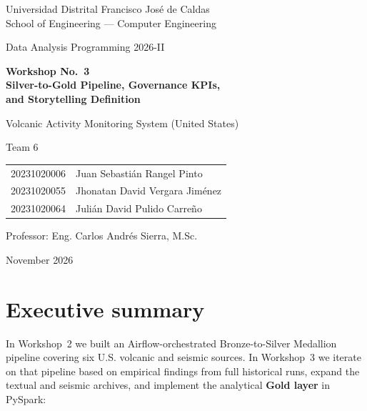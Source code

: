 \documentclass[11pt,a4paper]{article}
\begin{document}
\begin{titlepage}
\centering
{\large Universidad Distrital Francisco José de Caldas\\ School of Engineering --- Computer Engineering\par}
\vspace{1.2cm}
{\Large Data Analysis Programming 2026-II\par}
\vspace{1.5cm}
{\huge\bfseries Workshop No.~3\\[4pt] Silver-to-Gold Pipeline, Governance KPIs,\\ and Storytelling Definition\par}
\vspace{0.8cm}
{\Large Volcanic Activity Monitoring System (United States)\par}
\vspace{1.5cm}
{\large Team 6\par}
\vspace{0.4cm}
\begin{tabular}{ll}
20231020006 & Juan Sebastián Rangel Pinto\\
20231020055 & Jhonatan David Vergara Jiménez\\
20231020064 & Julián David Pulido Carreño\\
\end{tabular}
\vfill
{\large Professor: Eng. Carlos Andrés Sierra, M.Sc.\par}
\vspace{0.3cm}
{\large November 2026\par}
\end{titlepage}

\tableofcontents
\newpage

\section{Executive summary}

In Workshop~2 we built an Airflow-orchestrated Bronze-to-Silver Medallion pipeline covering six U.S. volcanic and seismic sources. In Workshop~3 we iterate on that pipeline based on empirical findings from full historical runs, expand the textual and seismic archives, and implement the analytical \textbf{Gold layer} in PySpark:
\end{document}
